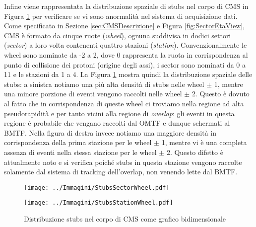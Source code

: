   Infine viene rappresentata la distribuzione spaziale di stubs nel corpo di CMS in Figura \ref{fig:StubsInCMS} per verificare se vi sono anormalità nel sistema di acquisizione dati. Come specificato in Sezione \ref{sec:CMSDescrizione} e Figura \ref{fig:SectorEtaView}, CMS è formato da cinque ruote (\textit{wheel}), ognuna suddivisa in dodici settori (\textit{sector}) a loro volta contenenti quattro stazioni (\textit{station}). Convenzionalmente le wheel sono nominate da -2 a 2, dove 0 rappresenta la ruota in corrispondenza al punto di collisione dei protoni (origine degli assi), i sector sono nominati da 0 a 11 e le stazioni da 1 a 4. La Figura \ref{fig:StubsInCMS} mostra quindi la distribuzione spaziale delle stubs: a sinistra notiamo una più alta densità di stubs nelle wheel $\pm$ 1, mentre una minore porzione di eventi vengono raccolti nelle wheel $\pm$ 2. Questo è dovuto al fatto che in corrispondenza di queste wheel ci troviamo nella regione ad alta pseudorapidità e per tanto vicini alla regione di \textit{overlap}: gli eventi in questa regione è probabile che vengano raccolti dal OMTF e dunque schermati al BMTF. Nella figura di destra invece notiamo una maggiore densità in corrispondenza della prima stazione per le wheel $\pm$ 1, mentre vi è una completa assenza di eventi nella stessa stazione per le wheel $\pm$ 2. Questo difetto è attualmente noto e si verifica poiché stubs in questa stazione vengono raccolte solamente dal sistema di tracking dell'overlap, non venendo lette dal BMTF.




  \begin{figure}[t]
    \centering
    \begin{minipage}[b]{0.49\textwidth}
        \centering
        \texttt{[image: ../Immagini/StubsSectorWheel.pdf]} 
      \end{minipage}
      \hfill 
      \begin{minipage}[b]{0.49\textwidth}
        \centering
        \texttt{[image: ../Immagini/StubsStationWheel.pdf]} 
      \end{minipage}
      \caption{Distribuzione stubs nel corpo di CMS come grafico bidimensionale}
    \label{fig:StubsInCMS}
  \end{figure}






